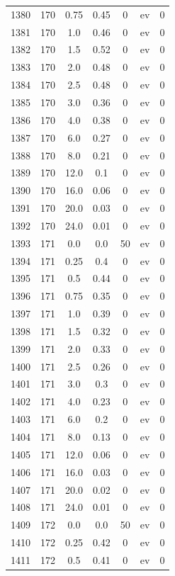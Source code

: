 \documentclass[12pt,a4paper]{article}
\begin{document}
\begin{tabular}{r|cccccc}
	1380 & 170 & 0.75 & 0.45 & 0 & ev & 0 \\
	1381 & 170 & 1.0 & 0.46 & 0 & ev & 0 \\
	1382 & 170 & 1.5 & 0.52 & 0 & ev & 0 \\
	1383 & 170 & 2.0 & 0.48 & 0 & ev & 0 \\
	1384 & 170 & 2.5 & 0.48 & 0 & ev & 0 \\
	1385 & 170 & 3.0 & 0.36 & 0 & ev & 0 \\
	1386 & 170 & 4.0 & 0.38 & 0 & ev & 0 \\
	1387 & 170 & 6.0 & 0.27 & 0 & ev & 0 \\
	1388 & 170 & 8.0 & 0.21 & 0 & ev & 0 \\
	1389 & 170 & 12.0 & 0.1 & 0 & ev & 0 \\
	1390 & 170 & 16.0 & 0.06 & 0 & ev & 0 \\
	1391 & 170 & 20.0 & 0.03 & 0 & ev & 0 \\
	1392 & 170 & 24.0 & 0.01 & 0 & ev & 0 \\
	1393 & 171 & 0.0 & 0.0 & 50 & ev & 0 \\
	1394 & 171 & 0.25 & 0.4 & 0 & ev & 0 \\
	1395 & 171 & 0.5 & 0.44 & 0 & ev & 0 \\
	1396 & 171 & 0.75 & 0.35 & 0 & ev & 0 \\
	1397 & 171 & 1.0 & 0.39 & 0 & ev & 0 \\
	1398 & 171 & 1.5 & 0.32 & 0 & ev & 0 \\
	1399 & 171 & 2.0 & 0.33 & 0 & ev & 0 \\
	1400 & 171 & 2.5 & 0.26 & 0 & ev & 0 \\
	1401 & 171 & 3.0 & 0.3 & 0 & ev & 0 \\
	1402 & 171 & 4.0 & 0.23 & 0 & ev & 0 \\
	1403 & 171 & 6.0 & 0.2 & 0 & ev & 0 \\
	1404 & 171 & 8.0 & 0.13 & 0 & ev & 0 \\
	1405 & 171 & 12.0 & 0.06 & 0 & ev & 0 \\
	1406 & 171 & 16.0 & 0.03 & 0 & ev & 0 \\
	1407 & 171 & 20.0 & 0.02 & 0 & ev & 0 \\
	1408 & 171 & 24.0 & 0.01 & 0 & ev & 0 \\
	1409 & 172 & 0.0 & 0.0 & 50 & ev & 0 \\
	1410 & 172 & 0.25 & 0.42 & 0 & ev & 0 \\
	1411 & 172 & 0.5 & 0.41 & 0 & ev & 0 \\

\end{tabular}
\end{document}
